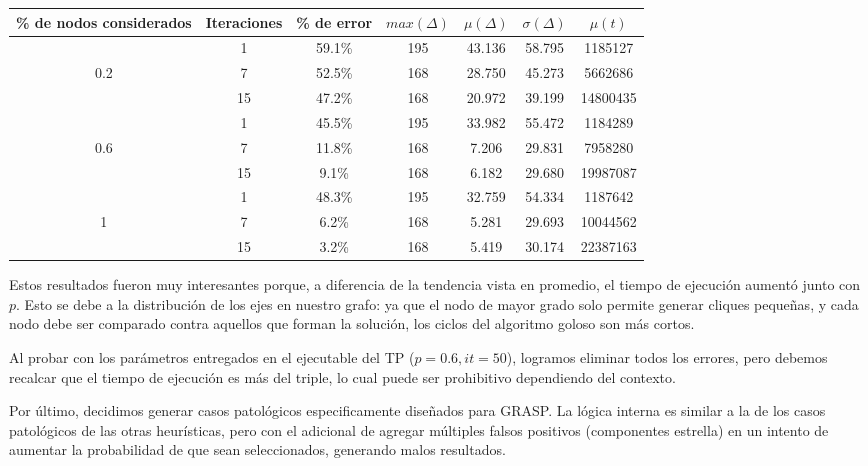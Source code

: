 \begin{center}
    \begin{tabular}{ | c | c | c | c | c | c | c |}
        \hline
        \% de nodos considerados & Iteraciones & \% de error & $max(\Delta)$ & $\mu(\Delta)$ & $\sigma(\Delta)$ & $\mu(t)$ \\ \hline
            & 1  & 59.1\% & 195 & 43.136 & 58.795 & 1185127  \\ \cline{2-7}
        0.2 & 7  & 52.5\% & 168 & 28.750 & 45.273 & 5662686  \\ \cline{2-7}
            & 15 & 47.2\% & 168 & 20.972 & 39.199 & 14800435 \\ \hline
            & 1  & 45.5\% & 195 & 33.982 & 55.472 & 1184289  \\ \cline{2-7}
        0.6 & 7  & 11.8\% & 168 & 7.206  & 29.831 & 7958280  \\ \cline{2-7}
            & 15 &  9.1\% & 168 & 6.182  & 29.680 & 19987087 \\ \hline
            & 1  & 48.3\% & 195 & 32.759 & 54.334 & 1187642  \\ \cline{2-7}
        1   & 7  &  6.2\% & 168 & 5.281  & 29.693 & 10044562 \\ \cline{2-7}
            & 15 &  3.2\% & 168 & 5.419  & 30.174 & 22387163 \\
        \hline
    \end{tabular}
\end{center}

Estos resultados fueron muy interesantes porque, a diferencia de la tendencia vista en promedio, el tiempo de ejecución aumentó junto con $p$. Esto se debe a la distribución de los ejes en nuestro grafo: ya que el nodo de mayor grado solo permite generar cliques pequeñas, y cada nodo debe ser comparado contra aquellos que forman la solución, los ciclos del algoritmo goloso son más cortos.

Al probar con los parámetros entregados en el ejecutable del TP ($p = 0.6, it = 50$), logramos eliminar todos los errores, pero debemos recalcar que el tiempo de ejecución es más del triple, lo cual puede ser prohibitivo dependiendo del contexto.

Por último, decidimos generar casos patológicos especificamente diseñados para GRASP. La lógica interna es similar a la de los casos patológicos de las otras heurísticas, pero con el adicional de agregar múltiples falsos positivos (componentes estrella) en un intento de aumentar la probabilidad de que sean seleccionados, generando malos resultados.


